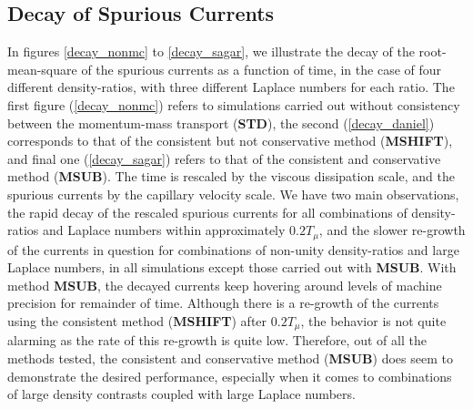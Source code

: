\subsection*{Decay of Spurious Currents}

In figures \ref{decay_nonmc} to \ref{decay_sagar}, we illustrate the decay of the root-mean-square of the spurious currents as a function of time, in the case of four different density-ratios, with three different Laplace numbers for each ratio. The first figure (\ref{decay_nonmc}) refers to simulations carried out without consistency between the momentum-mass transport (\textbf{STD}), the second (\ref{decay_daniel}) corresponds to that of the consistent but not conservative method (\textbf{MSHIFT}), and final one (\ref{decay_sagar}) refers to that of the consistent and conservative method (\textbf{MSUB}). The time is rescaled by the viscous dissipation scale, and the spurious currents by the capillary velocity scale. We have two main observations, the rapid decay of the rescaled spurious currents for all combinations of density-ratios and Laplace numbers within approximately $0.2 T_{\mu}$, and the slower re-growth of the currents in question for combinations of non-unity density-ratios and large Laplace numbers, in all simulations except those carried out with \textbf{MSUB}. With method \textbf{MSUB}, the decayed currents keep hovering around levels of machine precision for remainder of time. Although there is a re-growth of the currents using the consistent method (\textbf{MSHIFT}) after $0.2 T_{\mu}$, the behavior is not quite alarming as the rate of this re-growth is quite low. Therefore, out of all the methods tested, the consistent and conservative method (\textbf{MSUB}) does seem to demonstrate the desired performance, especially when it comes to combinations of large density contrasts coupled with large Laplace numbers.   


